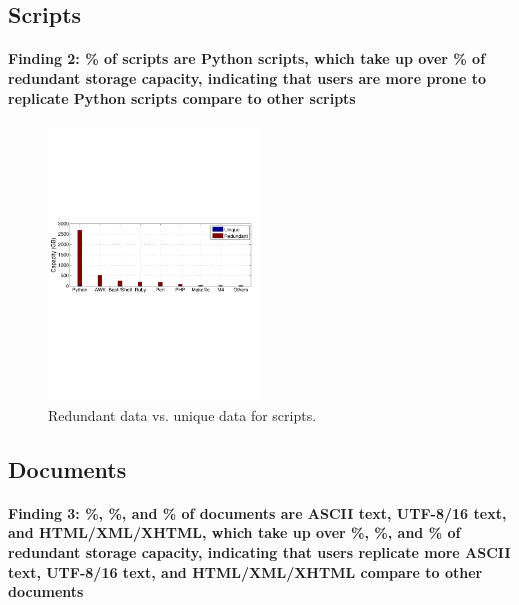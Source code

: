 
\subsection{Scripts}
\paragraph{Finding 2: \% of scripts are Python scripts, which take up over \% of redundant storage capacity, indicating that users are more prone to replicate Python scripts compare to other scripts}

\begin{figure}
	\centering
	\includegraphics[width=0.5\textwidth]{graphs/type-script-cap}
	\caption{Redundant data vs. unique data for scripts.
	}
	\label{fig:type-script}
\end{figure}



\subsection{Documents}
\paragraph{Finding 3: \%, \%, and \% of documents are ASCII text, UTF-8/16 text, and HTML/XML/XHTML, which take up over \%, \%, and \% of redundant storage capacity, indicating that users replicate more ASCII text, UTF-8/16 text, and HTML/XML/XHTML compare to other documents}

